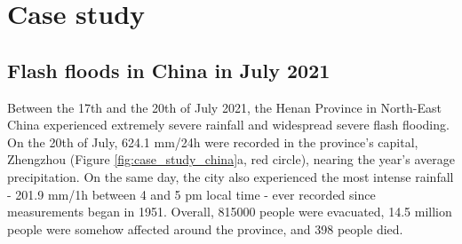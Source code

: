\begin{figure}[htbp]
\label{fig:verif_breakdown_scores_reliability_diagram}
\end{figure}


\section{Case study}
\label{regional_to_global_training_case_study}

\subsection{Flash floods in China in July 2021}

Between  the 17th and the 20th of July 2021, the Henan Province in North-East China experienced extremely severe rainfall and widespread severe flash flooding. On the 20th of July, 624.1 mm/24h were recorded in the province's capital, Zhengzhou (Figure \ref{fig:case_study_china}a, red circle), nearing the year's average precipitation. On the same day, the city also experienced the most intense rainfall - 201.9 mm/1h between 4 and 5 pm local time - ever recorded since measurements began in 1951. Overall, 815000 people were evacuated, 14.5 million people were somehow affected around the province, and 398 people died.


